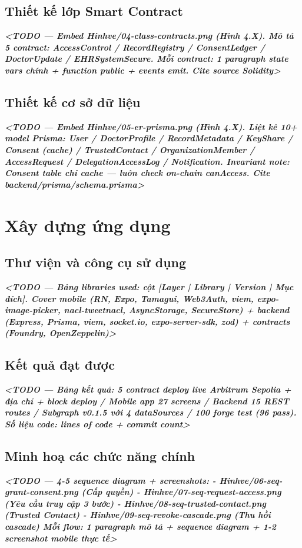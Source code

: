\documentclass[../DoAn]{subfiles}
\begin{document}
\subsection{Thiết kế lớp Smart Contract}
\textit{\textbf{<TODO — Embed Hinhve/04-class-contracts.png (Hình 4.X). Mô tả 5 contract: AccessControl / RecordRegistry / ConsentLedger / DoctorUpdate / EHRSystemSecure. Mỗi contract: 1 paragraph state vars chính + function public + events emit. Cite source Solidity>}}

\subsection{Thiết kế cơ sở dữ liệu}
\textit{\textbf{<TODO — Embed Hinhve/05-er-prisma.png (Hình 4.X). Liệt kê 10+ model Prisma: User / DoctorProfile / RecordMetadata / KeyShare / Consent (cache) / TrustedContact / OrganizationMember / AccessRequest / DelegationAccessLog / Notification. Invariant note: Consent table chỉ cache — luôn check on-chain canAccess. Cite backend/prisma/schema.prisma>}}

\section{Xây dựng ứng dụng}

\subsection{Thư viện và công cụ sử dụng}
\textit{\textbf{<TODO — Bảng libraries used: cột [Layer | Library | Version | Mục đích]. Cover mobile (RN, Expo, Tamagui, Web3Auth, viem, expo-image-picker, nacl-tweetnacl, AsyncStorage, SecureStore) + backend (Express, Prisma, viem, socket.io, expo-server-sdk, zod) + contracts (Foundry, OpenZeppelin)>}}

\subsection{Kết quả đạt được}
\textit{\textbf{<TODO — Bảng kết quả: 5 contract deploy live Arbitrum Sepolia + địa chỉ + block deploy / Mobile app 27 screens / Backend 15 REST routes / Subgraph v0.1.5 với 4 dataSources / 100 forge test (96 pass). Số liệu code: lines of code + commit count>}}

\subsection{Minh hoạ các chức năng chính}
\textit{\textbf{<TODO — 4-5 sequence diagram + screenshots:
- Hinhve/06-seq-grant-consent.png (Cấp quyền)
- Hinhve/07-seq-request-access.png (Yêu cầu truy cập 3 bước)
- Hinhve/08-seq-trusted-contact.png (Trusted Contact)
- Hinhve/09-seq-revoke-cascade.png (Thu hồi cascade)
Mỗi flow: 1 paragraph mô tả + sequence diagram + 1-2 screenshot mobile thực tế>}}
\end{document}
